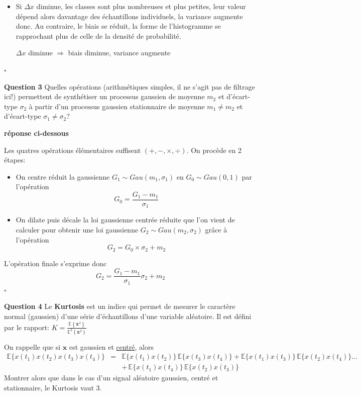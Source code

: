 \documentclass{article}
\newcommand{\debutrep}[1]{\color{blue}\begin{center} \hrulefill \textbf{ #1 } \hrulefill \end{center} }
\newcommand{\finrep}{\vspace*{5mm}\hfill $\square$\color{black}\vspace*{5mm}}
\begin{document}
\begin{list}{}{\setlength{\leftmargin}{2mm} \setlength{\labelwidth}{0mm} \setlength{\labelsep}{3mm} \setlength{\itemsep}{1mm} }
\begin{itemize}
    \item Si $\Delta x$ diminue, les classes sont plus nombreuses et plus petites, leur valeur dépend alors davantage des échantillons individuels, la variance augmente donc. Au contraire, le biais se réduit, la forme de l'histogramme se rapprochant plus de celle de la densité de probabilité.
   
    \vspace*{3mm}
    \begin{center}
        $\Delta x$ diminue $\Rightarrow$ biais diminue, variance augmente
    \end{center}


\end{itemize}
\finrep
 
\item[\textbf{Question 3}] Quelles opérations (arithmétiques simples, il ne s'agit pas de filtrage ici!) permettent de synthétiser un processus gaussien de moyenne $m_2$ et d'écart-type $\sigma_2$ à partir d'un processus gaussien stationnaire de moyenne $m_1 \neq m_2$ et d'écart-type $\sigma_1 \neq \sigma_2$?

\debutrep{réponse ci-dessous}
 Les quatres opérations élémentaires suffisent $(+,-,\times,\div)$.
On procède en 2 étapes:
\begin{itemize}
    \item On centre réduit la gaussienne $G_1 \sim Gau(m_1, \sigma_1)$ en $G_0 \sim Gau(0, 1)$ par l'opération 
    \[G_0 = \frac{G_1 - m_1}{\sigma_1}\]
    \item On dilate puis décale la loi gaussienne centrée réduite que l'on vient de calculer pour obtenir une loi gaussienne $G_2 \sim Gau(m_2,\sigma_2)$ grâce à l'opération
    \[ G_2 = G_0 \times \sigma_2 + m_2\]
\end{itemize}
L'opération finale s'exprime donc
\[ G_2 = \frac{G_1 - m_1} {\sigma_1}\sigma_2 + m_2 \]
 \finrep
 

\item[\textbf{Question 4}] Le {\bf Kurtosis} est un indice qui permet de mesurer le caractère normal (gaussien) d'une série d'échantillons d'une variable aléatoire. Il est défini par le rapport: ${\displaystyle K=\frac{\mathbb{E}\left\{\mathbf{x}^4\right\}}{\mathbb{E}^2\left\{\mathbf{x}^2\right\}}}$

On rappelle que si $\mathbf{x}$ est gaussien et \underline{centré}, alors
\begin{eqnarray*}
\mathbb{E}\{x(t_1)x(t_2)x(t_3)x(t_4)\} & = & \mathbb{E}\{x(t_1)x(t_2)\} \, \mathbb{E}\{x(t_3)x(t_4)\} +  \mathbb{E}\{x(t_1)x(t_3)\}\,\mathbb{E}\{x(t_2)x(t_4)\}  \ldots \\
& &+ \,\mathbb{E}\{x(t_1)x(t_4)\}\,\mathbb{E}\{x(t_2)x(t_3)\} 
\end{eqnarray*}
Montrer alors que dans le cas d'un signal aléatoire gaussien, centré et stationnaire, le Kurtosis vaut 3.



\end{list}
\end{document}
